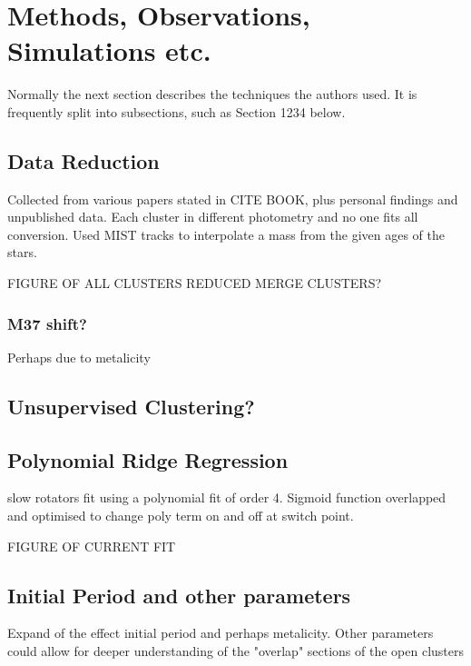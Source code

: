 \documentclass[fleqn,usenatbib]{mnras}
\begin{document}
\section{Methods, Observations, Simulations etc.}

Normally the next section describes the techniques the authors used.
It is frequently split into subsections, such as Section 1234 below.


\subsection{Data Reduction}
Collected from various papers stated in CITE BOOK, plus personal findings and unpublished data.
Each cluster in different photometry and no one fits all conversion.
Used MIST tracks to interpolate a mass from the given ages of the stars.

FIGURE OF ALL CLUSTERS REDUCED
MERGE CLUSTERS?

\subsubsection{M37 shift?}
Perhaps due to metalicity



\subsection{Unsupervised Clustering?}

\subsection{Polynomial Ridge Regression}
slow rotators fit using a polynomial fit of order 4.
Sigmoid function overlapped and optimised to change poly term on and off at switch point.

FIGURE OF CURRENT FIT

\subsection{Initial Period and other parameters}
Expand of the effect initial period and perhaps metalicity.
Other parameters could allow for deeper understanding of the "overlap" sections of the open clusters
\end{document}
